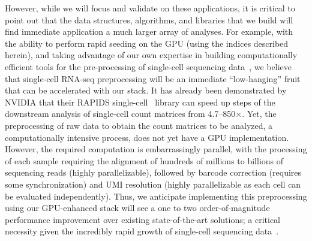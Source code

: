 However, while we will focus and validate on these applications, it is critical
to point out that the data structures, algorithms, and libraries that we build
will find immediate application a much larger array of analyses. For example, with the ability to perform
rapid seeding on the GPU (using the indices described herein), and taking
advantage of our own expertise in building computationally efficient tools for
the pre-processing of single-cell sequencing data~\cite{he2022alevin}, we
believe that single-cell RNA-seq preprocessing will be an immediate
``low-hanging'' fruit that can be accelerated with our stack. It has already
been demonstrated by NVIDIA that their RAPIDS single-cell~\cite{rapids} library
can speed up steps of the downstream analysis of single-cell count matrices
from 4.7--850$\times$. Yet, the preprocessing of raw data to obtain the count
matrices to be analyzed, a computationally intensive process, does not yet have
a GPU implementation. However, the required computation is embarrassingly
parallel, with the processing of each sample requiring the alignment of
hundreds of millions to billions of sequencing reads (highly parallelizable),
followed by barcode correction (requires some synchronization) and UMI
resolution (highly parallelizable as each cell can be evaluated independently).
Thus, we anticipate implementing this preprocessing using our GPU-enhanced
stack will see a one to two order-of-magnitude performance improvement over
existing state-of-the-art solutions; a critical necessity given the incredibly
rapid growth of single-cell sequencing data~\cite{scgrowth2022}.






